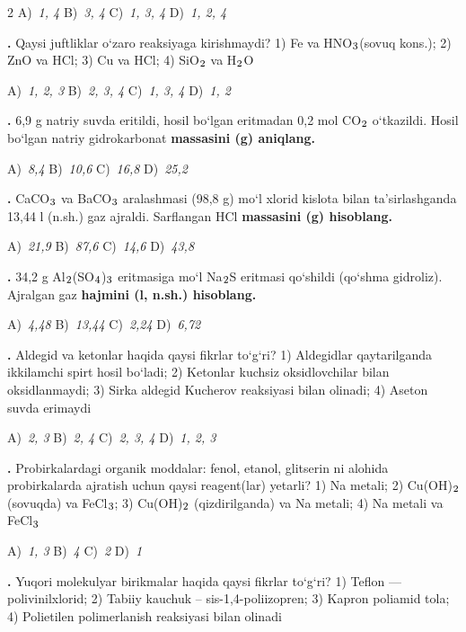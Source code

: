 \documentclass[11pt,a4paper]{article}
\renewcommand{\textsubscript}[1]{\ensuremath{_{\text{\fontsize{8}{8}\selectfont #1}}}}
\newcommand{\qn}[1]{\textbf{\fontsize{11.5}{13}\selectfont #1}}
\newcommand{\qsep}{\par\vspace{13pt}}
\begin{document}
\begin{multicols}{2}
\noindent A)~\textsl{1, 4} \hfill B)~\textsl{3, 4} \hfill C)~\textsl{1, 3, 4} \hfill D)~\textsl{1, 2, 4}\par
\qsep
\noindent\qn{16.} Qaysi juftliklar o`zaro reaksiyaga kirishmaydi? 1) Fe va HNO\textsubscript{3}(sovuq kons.); 2) ZnO va HCl; 3) Cu va HCl; 4) SiO\textsubscript{2} va H\textsubscript{2}O

\noindent A)~\textsl{1, 2, 3} \hfill B)~\textsl{2, 3, 4} \hfill C)~\textsl{1, 3, 4} \hfill D)~\textsl{1, 2}\par
\qsep
\noindent\qn{17.} 6,9 g natriy suvda eritildi, hosil bo`lgan eritmadan 0,2 mol CO\textsubscript{2} o`tkazildi. Hosil bo`lgan natriy gidrokarbonat \textbf{massasini (g) aniqlang.}

\noindent A)~\textsl{8,4} \hfill B)~\textsl{10,6} \hfill C)~\textsl{16,8} \hfill D)~\textsl{25,2}\par
\qsep
\noindent\qn{18.} CaCO\textsubscript{3} va BaCO\textsubscript{3} aralashmasi (98,8 g) mo`l xlorid kislota bilan ta'sirlashganda 13,44 l (n.sh.) gaz ajraldi. Sarflangan HCl \textbf{massasini (g) hisoblang.}

\noindent A)~\textsl{21,9} \hfill B)~\textsl{87,6} \hfill C)~\textsl{14,6} \hfill D)~\textsl{43,8}\par
\qsep
\noindent\qn{19.} 34,2 g Al\textsubscript{2}(SO\textsubscript{4})\textsubscript{3} eritmasiga mo`l Na\textsubscript{2}S eritmasi qo`shildi (qo`shma gidroliz). Ajralgan gaz \textbf{hajmini (l, n.sh.) hisoblang.}

\noindent A)~\textsl{4,48} \hfill B)~\textsl{13,44} \hfill C)~\textsl{2,24} \hfill D)~\textsl{6,72}\par
\qsep
\noindent\qn{20.} Aldegid va ketonlar haqida qaysi fikrlar to`g`ri? 1) Aldegidlar qaytarilganda ikkilamchi spirt hosil bo`ladi; 2) Ketonlar kuchsiz oksidlovchilar bilan oksidlanmaydi; 3) Sirka aldegid Kucherov reaksiyasi bilan olinadi; 4) Aseton suvda erimaydi

\noindent A)~\textsl{2, 3} \hfill B)~\textsl{2, 4} \hfill C)~\textsl{2, 3, 4} \hfill D)~\textsl{1, 2, 3}\par
\qsep
\noindent\qn{21.} Probirkalardagi organik moddalar: fenol, etanol, glitserin ni alohida probirkalarda ajratish uchun qaysi reagent(lar) yetarli? 1) Na metali; 2) Cu(OH)\textsubscript{2} (sovuqda) va FeCl\textsubscript{3}; 3) Cu(OH)\textsubscript{2} (qizdirilganda) va Na metali; 4) Na metali va FeCl\textsubscript{3}

\noindent A)~\textsl{1, 3} \hfill B)~\textsl{4} \hfill C)~\textsl{2} \hfill D)~\textsl{1}\par
\qsep
\noindent\qn{22.} Yuqori molekulyar birikmalar haqida qaysi fikrlar to`g`ri? 1) Teflon --- polivinilxlorid; 2) Tabiiy kauchuk -- sis-1,4-poliizopren; 3) Kapron poliamid tola; 4) Polietilen polimerlanish reaksiyasi bilan olinadi


\end{multicols}
\end{document}

